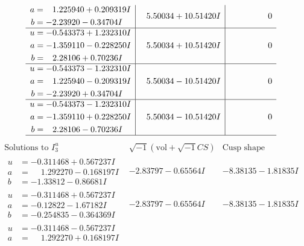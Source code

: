 \documentclass[1p]{elsarticle_modified}
\theoremstyle{definition}
\newcommand{\I}{\sqrt{-1}}
\begin{document}
$$\begin{array}{c|c|c}
\begin{aligned}
a &= \phantom{-}1.225940 + 0.209319 I \\
b &= -2.23920 - 0.34704 I\end{aligned}
 & \phantom{-}5.50034 + 10.51420 I & \phantom{-0.000000 } 0 \\ \hline\begin{aligned}
u &= -0.543373 + 1.232310 I \\
a &= -1.359110 - 0.228250 I \\
b &= \phantom{-}2.28106 + 0.70236 I\end{aligned}
 & \phantom{-}5.50034 + 10.51420 I & \phantom{-0.000000 } 0 \\ \hline\begin{aligned}
u &= -0.543373 - 1.232310 I \\
a &= \phantom{-}1.225940 - 0.209319 I \\
b &= -2.23920 + 0.34704 I\end{aligned}
 & \phantom{-}5.50034 - 10.51420 I & \phantom{-0.000000 } 0 \\ \hline\begin{aligned}
u &= -0.543373 - 1.232310 I \\
a &= -1.359110 + 0.228250 I \\
b &= \phantom{-}2.28106 - 0.70236 I\end{aligned}
 & \phantom{-}5.50034 - 10.51420 I & \phantom{-0.000000 } 0\\
 \hline 
 \end{array}$$\newpage$$\begin{array}{c|c|c}  
\text{Solutions to }I^u_{3}& \I (\text{vol} + \sqrt{-1}CS) & \text{Cusp shape}\\
 \hline 
\begin{aligned}
u &= -0.311468 + 0.567237 I \\
a &= \phantom{-}1.292270 - 0.168197 I \\
b &= -1.33812 - 0.86681 I\end{aligned}
 & -2.83797 - 0.65564 I & -8.38135 - 1.81835 I \\ \hline\begin{aligned}
u &= -0.311468 + 0.567237 I \\
a &= -0.12822 - 1.67182 I \\
b &= -0.254835 - 0.364369 I\end{aligned}
 & -2.83797 - 0.65564 I & -8.38135 - 1.81835 I \\ \hline\begin{aligned}
u &= -0.311468 - 0.567237 I \\
a &= \phantom{-}1.292270 + 0.168197 I \\

\end{aligned}
\end{array}$$
\end{document}
